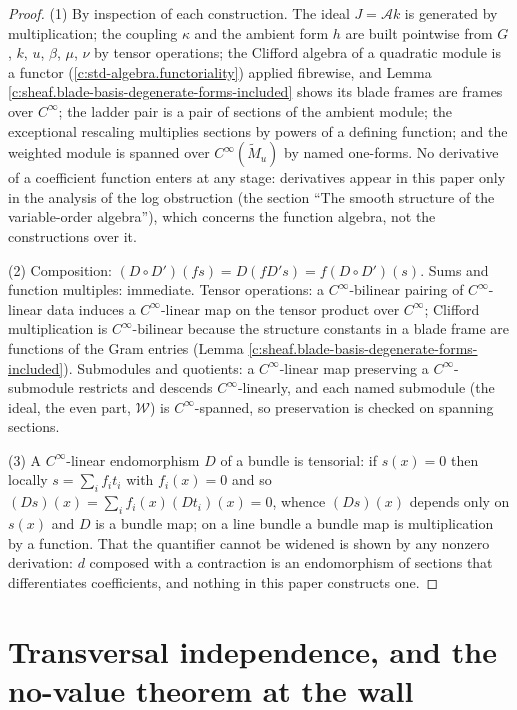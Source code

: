 \documentclass[11pt]{article}
\theoremstyle{definition}
\theoremstyle{plain}
\providecommand{\Mt}{}\renewcommand{\Mt}{\widetilde{M}}
\providecommand{\shA}{}\renewcommand{\shA}{\mathcal{A}}
\providecommand{\shW}{}\renewcommand{\shW}{\mathcal{W}}
\begin{document}
\begin{proof}
(1) By inspection of each construction. The ideal $J = \shA k$ is generated by multiplication; the coupling $\kappa$ and the ambient form $h$ are built pointwise from $G$, $k$, $u$, $\beta$, $\mu$, $\nu$ by tensor operations; the Clifford algebra of a quadratic module is a functor (\ref{c:std-algebra.functoriality}) applied fibrewise, and Lemma \ref{c:sheaf.blade-basis-degenerate-forms-included} shows its blade frames are frames over $C^\infty$; the ladder pair is a pair of sections of the ambient module; the exceptional rescaling multiplies sections by powers of a defining function; and the weighted module is spanned over $C^\infty(\Mt_u)$ by named one-forms. No derivative of a coefficient function enters at any stage: derivatives appear in this paper only in the analysis of the log obstruction (the section ``The smooth structure of the variable-order algebra''), which concerns the function algebra, not the constructions over it.

(2) Composition: $(D \circ D')(fs) = D(fD's) = f(D \circ D')(s)$. Sums and function multiples: immediate. Tensor operations: a $C^\infty$-bilinear pairing of $C^\infty$-linear data induces a $C^\infty$-linear map on the tensor product over $C^\infty$; Clifford multiplication is $C^\infty$-bilinear because the structure constants in a blade frame are functions of the Gram entries (Lemma \ref{c:sheaf.blade-basis-degenerate-forms-included}). Submodules and quotients: a $C^\infty$-linear map preserving a $C^\infty$-submodule restricts and descends $C^\infty$-linearly, and each named submodule (the ideal, the even part, $\shW$) is $C^\infty$-spanned, so preservation is checked on spanning sections.

(3) A $C^\infty$-linear endomorphism $D$ of a bundle is tensorial: if $s(x) = 0$ then locally $s = \sum_i f_i t_i$ with $f_i(x) = 0$ and so $(Ds)(x) = \sum_i f_i(x)(Dt_i)(x) = 0$, whence $(Ds)(x)$ depends only on $s(x)$ and $D$ is a bundle map; on a line bundle a bundle map is multiplication by a function. That the quantifier cannot be widened is shown by any nonzero derivation: $d$ composed with a contraction is an endomorphism of sections that differentiates coefficients, and nothing in this paper constructs one.

\end{proof}

\section{Transversal independence, and the no-value theorem at the wall}
\end{document}
